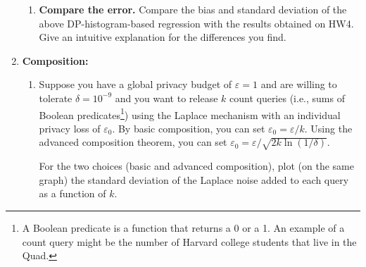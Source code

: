 \documentclass[11pt]{article}
\begin{document}
\begin{enumerate}[leftmargin=*]
\begin{enumerate}
			\item \textbf{Compare the error.} 
			Compare the bias and standard deviation of the above DP-histogram-based regression with the results obtained on HW4. 
			Give an intuitive explanation for the differences you find.
		\end{enumerate}
		
		
		\item \textbf{Composition:}
		
		\begin{enumerate}
			\item  \label{part:optimal}
			Suppose you have a global privacy budget of $\varepsilon=1$ and are willing to tolerate $\delta=10^{-9}$ and you want to release $k$ count queries (i.e., sums of Boolean predicates\footnote{A Boolean predicate is a function that returns a 0 or a 1. An example of a count query might be the
				number of Harvard college students that live in the Quad.}) using the Laplace mechanism with an individual privacy loss of $\varepsilon_0$.  By basic composition, you can set
			$\varepsilon_0=\varepsilon/k$.   Using the advanced composition theorem, you can set
			$\varepsilon_0=\varepsilon /\sqrt{2k\ln(1/\delta)}$.
			
			For the two choices (basic and advanced composition), plot (on the same graph) the standard deviation of the Laplace noise added to each query as a function of $k$.
			
			
			

\end{enumerate}
\end{enumerate}
\end{document}
